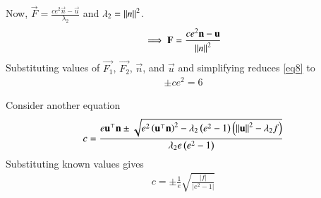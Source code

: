 \documentclass[journal]{IEEEtran}
\begin{document}
Now, $\vec{F}=\frac{ce^2\vec{n}-\vec{u}}{\lambda_2}$ and $\lambda_2=\left\lVert n\right\rVert^2$.
\\
\begin{align}
\implies\mathbf{F}=\frac{ce^2\mathbf{n}-\mathbf{u}}{\left\lVert n\right\rVert^2} \label{eq8}
\end{align}
Substituting values of $\vec{F_1}$, $\vec{F_2}$, $\vec{n}$, and $\vec{u}$ and simplifying reduces \ref{eq8} to
\begin{align}
\pm ce^2=6 \label{eq9}
\end{align}

Consider another equation $$c=\frac{e\mathbf{u}^\top\mathbf{n}\pm\sqrt{e^2\left(\mathbf{u}^\top\mathbf{n}\right)^2-\lambda_2\left(e^2-1\right)\left(\left\lVert\mathbf{u}\right\rVert^2-\lambda_2f\right)}}{\lambda_2e\left(e^2-1\right)}$$
Substituting known values gives
\begin{align}
c=\pm\frac{1}{e}\sqrt{\frac{|f|}{|e^2-1|}} \label{eq10}
\end{align}
\end{document}
